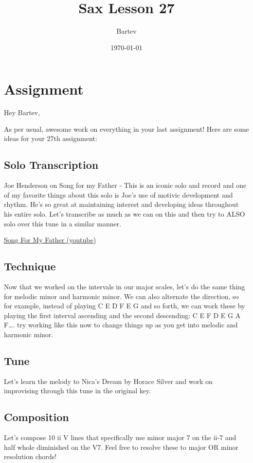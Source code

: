 \documentclass[11pt]{article}
\author{Bartev}
\date{\today}
\title{Sax Lesson 27}
\let\maketitle\relax %
\begin{document}
\maketitle
\tableofcontents

\section{Assignment}
\label{sec:org81380f0}

Hey Bartev,

As per usual, awesome work on everything in your last assignment! Here are some ideas for your 27th assignment:
\subsection{Solo Transcription}
\label{sec:org51d872b}
Joe Henderson on Song for my Father - This is an iconic solo and record and one of my favorite things about this solo is Joe's use of motivic development and rhythm. He's so great at maintaining interest and developing ideas throughout his entire solo. Let's transcribe as much as we can on this and then try to ALSO solo over this tune in a similar manner.

\href{https://www.youtube.com/watch?v=CWeXOm49kE0}{Song For My Father (youtube)}
\subsection{Technique}
\label{sec:org33d3232}
Now that we worked on the intervals in our major scales, let's do the same thing for melodic minor and harmonic minor. We can also alternate the direction, so for example, instead of playing C E D F E G and so forth, we can work these by playing the first interval ascending and the second descending: C E F D E G A F\ldots{}. try working like this now to change things up as you get into melodic and harmonic minor.
\subsection{Tune}
\label{sec:orgdb9ccd3}
Let's learn the melody to Nica's Dream by Horace Silver and work on improvising through this tune in the original key.
\subsection{Composition}
\label{sec:org73b7ad2}
Let's compose 10 ii V lines that specifically use minor major 7 on the ii-7 and half whole diminished on the V7. Feel free to resolve these to major OR minor resolution chords!
\end{document}
